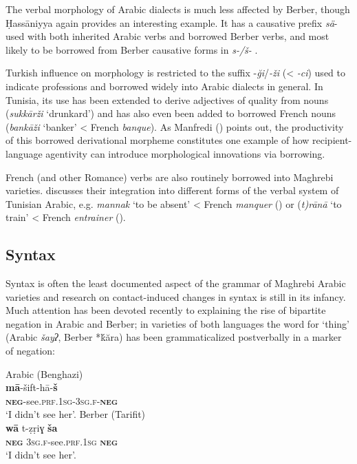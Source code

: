 \documentclass[output=paper]{langsci/langscibook}
\begin{document}
  The verbal morphology of Arabic dialects is much less affected by Berber, though Ḥassāniyya again provides an interesting example. It has a causative prefix \textit{sä}- used with both inherited Arabic verbs and borrowed Berber verbs, and most likely to be borrowed from Berber causative forms in \textit{s-/š-} \citep{Taine-Cheikh2008chapter}. 

  Turkish influence on morphology is restricted to the suffix -\textit{ği}/\textit{{}-ži} (< \textit{{}-ci}) used to indicate professions and borrowed widely into Arabic dialects in general. In Tunisia, its use has been extended to derive adjectives of quality from nouns (\textit{sukkārži} ‘drunkard’) and has also even been added to borrowed French nouns (\textit{bankāži} ‘banker’ < French \textit{banque}). As Manfredi (\citeyear[410]{Manfredi2018}) points out, the productivity of this borrowed derivational morpheme constitutes one example of how recipient-language agentivity can introduce morphological innovations via borrowing.

  French (and other Romance) verbs are also routinely borrowed into Maghrebi varieties. \citet{Talmoudi1986} discusses their integration into different forms of the verbal system of Tunisian Arabic, e.g. \textit{mannak} `to be absent' < French \textit{manquer} (\citeyear[81--82]{Talmoudi1986}) or (\textit{t)rānā} `to train' < French \textit{entrainer} (\citeyear[21--24]{Talmoudi1986}).

\subsection{ Syntax}

Syntax is often the least documented aspect of the grammar of Maghrebi Arabic varieties and research on contact-induced changes in syntax is still in its infancy. Much attention has been devoted recently to explaining the rise of bipartite negation in Arabic and Berber; in varieties of both languages the word for ‘thing’ (Arabic \textit{šayʔ}, Berber *ḱăra) has been grammaticalized postverbally in a marker of negation:


\ea\label{ex:key:}


Arabic (Benghazi)\\
\gll \textbf{mā}-šift-hā-\textbf{š}\\
     \textbf{\textsc{neg}}-see.\textsc{prf}.\textsc{1sg}-\textsc{3sg.f}-\textbf{\textsc{neg}}\\
\glt `I didn’t see her'.
\z
\ea Berber (Tarifit)\\
\gll \textbf{wā}  t-ẓṛiɣ  \textbf{ša}\\
     \textbf{\textsc{neg}}  \textsc{3sg.f}-see.\textsc{prf}.\textsc{1sg}  \textbf{\textsc{neg}}\\
\glt `I didn’t see her'.
\z
\end{document}
